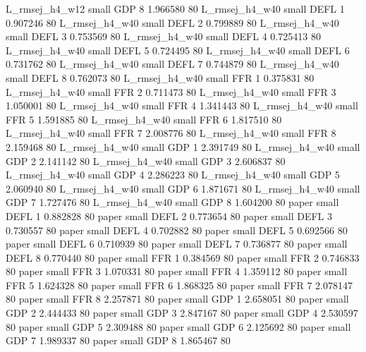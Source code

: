 L_rmsej_h4_w12      small      GDP                 8 1.966580 80
L_rmsej_h4_w40      small     DEFL                 1 0.907246 80
L_rmsej_h4_w40      small     DEFL                 2 0.799889 80
L_rmsej_h4_w40      small     DEFL                 3 0.753569 80
L_rmsej_h4_w40      small     DEFL                 4 0.725413 80
L_rmsej_h4_w40      small     DEFL                 5 0.724495 80
L_rmsej_h4_w40      small     DEFL                 6 0.731762 80
L_rmsej_h4_w40      small     DEFL                 7 0.744879 80
L_rmsej_h4_w40      small     DEFL                 8 0.762073 80
L_rmsej_h4_w40      small      FFR                 1 0.375831 80
L_rmsej_h4_w40      small      FFR                 2 0.711473 80
L_rmsej_h4_w40      small      FFR                 3 1.050001 80
L_rmsej_h4_w40      small      FFR                 4 1.341443 80
L_rmsej_h4_w40      small      FFR                 5 1.591885 80
L_rmsej_h4_w40      small      FFR                 6 1.817510 80
L_rmsej_h4_w40      small      FFR                 7 2.008776 80
L_rmsej_h4_w40      small      FFR                 8 2.159468 80
L_rmsej_h4_w40      small      GDP                 1 2.391749 80
L_rmsej_h4_w40      small      GDP                 2 2.141142 80
L_rmsej_h4_w40      small      GDP                 3 2.606837 80
L_rmsej_h4_w40      small      GDP                 4 2.286223 80
L_rmsej_h4_w40      small      GDP                 5 2.060940 80
L_rmsej_h4_w40      small      GDP                 6 1.871671 80
L_rmsej_h4_w40      small      GDP                 7 1.727476 80
L_rmsej_h4_w40      small      GDP                 8 1.604200 80
         paper      small     DEFL                 1 0.882828 80
         paper      small     DEFL                 2 0.773654 80
         paper      small     DEFL                 3 0.730557 80
         paper      small     DEFL                 4 0.702882 80
         paper      small     DEFL                 5 0.692566 80
         paper      small     DEFL                 6 0.710939 80
         paper      small     DEFL                 7 0.736877 80
         paper      small     DEFL                 8 0.770440 80
         paper      small      FFR                 1 0.384569 80
         paper      small      FFR                 2 0.746833 80
         paper      small      FFR                 3 1.070331 80
         paper      small      FFR                 4 1.359112 80
         paper      small      FFR                 5 1.624328 80
         paper      small      FFR                 6 1.868325 80
         paper      small      FFR                 7 2.078147 80
         paper      small      FFR                 8 2.257871 80
         paper      small      GDP                 1 2.658051 80
         paper      small      GDP                 2 2.444433 80
         paper      small      GDP                 3 2.847167 80
         paper      small      GDP                 4 2.530597 80
         paper      small      GDP                 5 2.309488 80
         paper      small      GDP                 6 2.125692 80
         paper      small      GDP                 7 1.989337 80
         paper      small      GDP                 8 1.865467 80